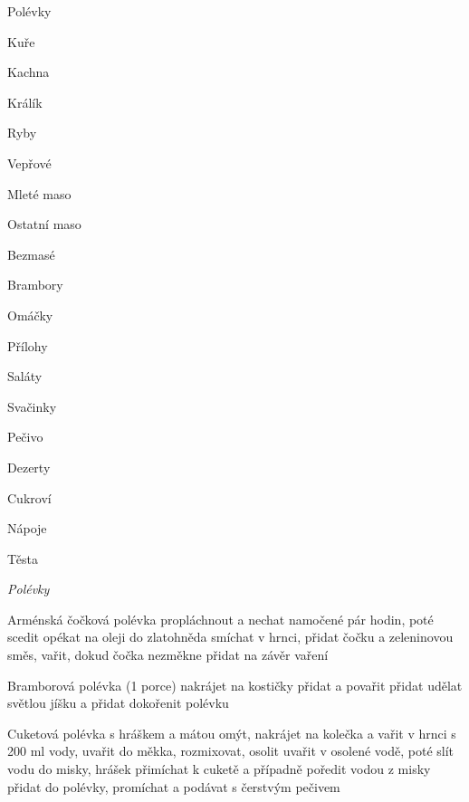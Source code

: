 \documentclass[12pt,a4paper]{article}
\begin{document}
\vspace*{\fill}
{\Huge\it
\centerline{Polévky}
\centerline{Kuře}
\centerline{Kachna}
\centerline{Králík}
\centerline{Ryby}
\centerline{Vepřové}
\centerline{Mleté maso}
\centerline{Ostatní maso}
\centerline{Bezmasé}
\centerline{Brambory}
\centerline{Omáčky}
\centerline{Přílohy}
\centerline{Saláty}
\centerline{Svačinky}
\centerline{Pečivo}
\centerline{Dezerty}
\centerline{Cukroví}
\centerline{Nápoje}
\centerline{Těsta}
}
\vspace*{\fill}
\newpage

\vspace*{\fill}
\hfill {\Huge\it Polévky}\hfill
\vspace*{\fill}
\newpage

\begin{recipe}{Arménská čočková polévka}
   propláchnout a nechat namočené pár hodin, poté scedit
   opékat na oleji do zlatohněda
   smíchat v hrnci, přidat čočku a zeleninovou směs, vařit, dokud čočka nezměkne
   přidat na závěr vaření
\end{recipe}
\newpage

\begin{recipe}{Bramborová polévka (1 porce)}
   nakrájet na kostičky
   přidat a povařit
   přidat
   udělat světlou jíšku a přidat
   dokořenit polévku
\end{recipe}
\newpage

\begin{recipe}{Cuketová polévka s hráškem a mátou}
   omýt, nakrájet na kolečka a vařit v hrnci s 200 ml vody, uvařit do měkka, rozmixovat, osolit
   uvařit v osolené vodě, poté slít vodu do misky, hrášek přimíchat k cuketě a případně poředit vodou z misky
   přidat do polévky, promíchat a podávat s čerstvým pečivem
\end{recipe}
\newpage
\end{document}
